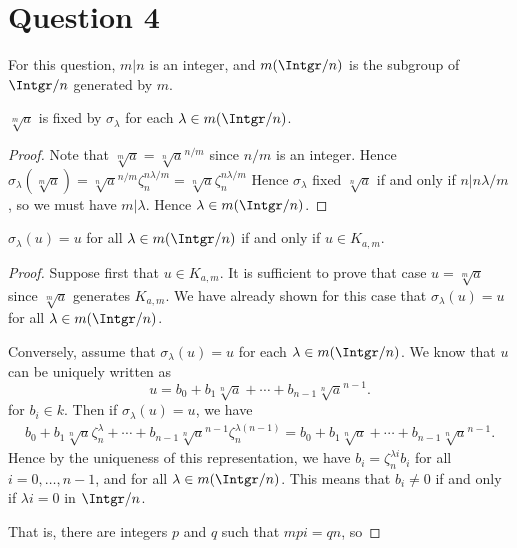 \documentclass{unswmaths}
\begin{document}
\section*{Question 4}
For this question, $m|n$ is an integer, and $m(\Intgr/n)$ is the subgroup of $\Intgr/n$
generated by $m$.
\begin{lemma}
    $\sqrt[m]{a}$ is fixed by $\sigma_\lambda$ for each $\lambda \in m(\Intgr/n)$.
\end{lemma}
\begin{proof}
    Note that $\sqrt[m]{a} = \sqrt[n]{a}^{n/m}$ since $n/m$ is an integer. 
    Hence $\sigma_\lambda(\sqrt[m]{a}) = \sqrt[n]{a}^{n/m}\zeta_n^{n\lambda/m} = \sqrt[n]{a}\zeta_n^{n\lambda/m}$
    Hence $\sigma_\lambda$ fixed $\sqrt[n]{a}$ if and only if $n| n\lambda/m$, so we must have $m|\lambda$.
    Hence $\lambda \in m(\Intgr/n)$.
\end{proof}

\begin{theorem}
    $\sigma_\lambda(u) = u$ for all $\lambda \in m(\Intgr/n)$ if and only if $u \in K_{a,m}$.
\end{theorem}
\begin{proof}
    Suppose first that $u \in K_{a,m}$. It is sufficient to prove that case $u = \sqrt[m]{a}$
    since $\sqrt[m]{a}$ generates $K_{a,m}$. We have already shown for this case that $\sigma_\lambda(u) = u$
    for all $\lambda \in m(\Intgr/n)$.
    
    Conversely, assume that $\sigma_\lambda(u) = u$ for each $\lambda \in m(\Intgr/n)$. We
    know that $u$ can be uniquely written as
    \begin{equation*}
        u = b_0+b_1\sqrt[n]{a}+\cdots+b_{n-1}\sqrt[n]{a}^{n-1}.
    \end{equation*}
    for $b_i\in k$. Then if $\sigma_\lambda(u) = u$, we have
    \begin{align*}
        b_0+ b_1\sqrt[n]{a}\zeta_n^\lambda+\cdots+b_{n-1}\sqrt[n]{a}^{n-1}\zeta_n^{\lambda(n-1)} = b_0+b_1\sqrt[n]{a}+\cdots+b_{n-1}\sqrt[n]{a}^{n-1}.
    \end{align*}
    Hence by the uniqueness of this representation, we have $b_i = \zeta_n^{\lambda i}b_i$ for all $i = 0,\ldots,n-1$,
    and for all $\lambda \in m(\Intgr/n)$. This means that $b_i \neq 0$ if and only if $\lambda i = 0$ in $\Intgr/n$.
    
    That is, there are integers $p$ and $q$ such that $mpi = qn$, so 
    
\end{proof}
        
\end{document}
